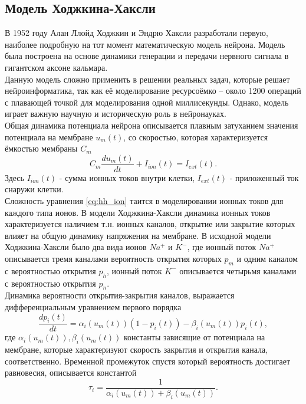 \documentclass[a4paper,10pt]{article}
\begin{document}
\subsection{Модель Ходжкина-Хаксли}
	В 1952 году Алан Ллойд Ходжкин и Эндрю Хаксли разработали первую, наиболее подробную на тот момент математическую модель нейрона. Модель была построена на основе динамики генерации и передачи нервного сигнала в гигантском аксоне кальмара.\\
	\indent Данную модель сложно применить в решении реальных задач, которые решает нейроинформатика, так как её моделирование ресурсоёмко -- около 1200 операций с плавающей точкой для моделирования одной миллисекунды\cite{BohteReview}. Однако, модель играет важную научную и историческую роль в нейронауках.\\
	\indent Общая динамика потенциала нейрона описывается плавным затуханием значения потенциала на мембране $u_{m}(t)$, со скоростью, которая характеризуется ёмкостью мембраны $C_{m}$
	\begin{equation}\label{eq:hh}
	C_{m}\frac{du_{m}(t)}{dt}+I_{ion}(t)=I_{ext}(t).
	\end{equation}	 
	\indent Здесь $I_{ion}(t)$ - сумма ионных токов внутри клетки, $I_{ext}(t)$ - приложенный ток снаружи клетки.\\
	\indent Сложность уравнения \eqref{eq:hh_ion}	 таится в моделировании ионных токов для каждого типа ионов. В модели Ходжкина-Хаксли динамика ионных токов характеризуется наличием т.н. ионных каналов, открытие или закрытие которых влияет на общую динамику напряжения на мембране. В исходной модели Ходжкина-Хаксли было два вида ионов $Na^{+}$ и $K^{-}$, где ионный поток $Na^{+}$ описывается тремя каналами вероятность открытия которых $p_{m}$ и одним каналом с вероятностью открытия $p_{h}$, ионный поток $K^{-}$ описывается четырьмя каналами с вероятностью открытия $p_{n}$\cite{Genesis}.\\ 
	\indent Динамика вероятности открытия-закрытия каналов, выражается дифференциальным уравнением первого порядка
	\begin{equation}\label{eq:hh_pch}
	\frac{dp_{i}(t)}{dt} = \alpha_{i}(u_{m}(t))(1-p_{i}(t)) - \beta_{i}(u_{m}(t))p_{i}(t),
	\end{equation}	 
	где $\alpha_{i}(u_{m}(t)), \beta_{i}(u_{m}(t))$ константы зависящие от потенциала на мембране, которые характеризуют скорость закрытия и открытия канала, соответственно. Временной промежуток спустя который вероятность достигает равновесия, описывается константой
	\begin{equation}\label{eq:hh_t}
	\tau_{i}=\frac{1}{\alpha_{i}(u_{m}(t))+\beta_{i}(u_{m}(t))}.	
	\end{equation}
\end{document}
